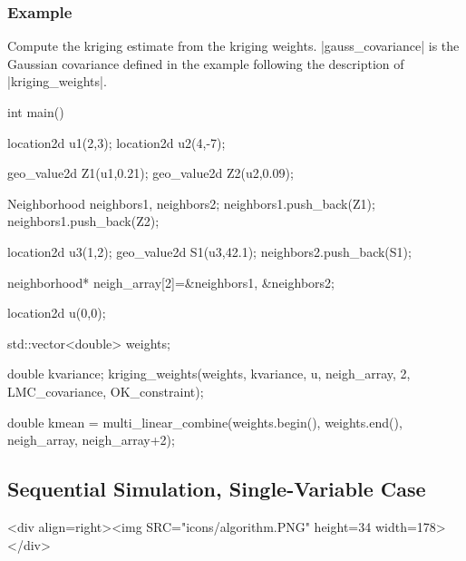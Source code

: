 \documentclass[12pt,twoside]{report}
\begin{document}
 

\htmlrule[CLEAR=all]  \subsubsection*{Example}
Compute the kriging estimate from the kriging weights. |gauss_covariance| is the Gaussian covariance defined in the example following the description of |kriging_weights|.


\begin{code}
int main()
{  
  location2d u1(2,3);
  location2d u2(4,-7);

  geo_value2d Z1(u1,0.21);
  geo_value2d Z2(u2,0.09); 
  
  Neighborhood neighbors1, neighbors2;
  neighbors1.push_back(Z1);
  neighbors1.push_back(Z2);

  location2d u3(1,2);
  geo_value2d S1(u3,42.1);
  neighbors2.push_back(S1);

  neighborhood* neigh_array[2]={&neighbors1, &neighbors2};

  location2d u(0,0);

  std::vector<double> weights;

  double kvariance;
  kriging_weights(weights, kvariance,
                  u, neigh_array, 2,
                  LMC_covariance, OK_constraint);

  double kmean = multi_linear_combine(weights.begin(),
                                      weights.end(),
                                      neigh_array, neigh_array+2);
}

\end{code}









\subsection{Sequential Simulation, Single-Variable Case}
\begin{htmlonly}
<div align=right><img SRC="icons/algorithm.PNG" height=34 width=178></div>
\end{htmlonly}
\end{document}

